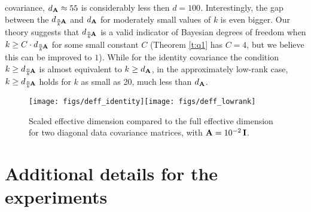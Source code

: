 \documentclass[11pt]{article}
\begin{document}
    covariance, $d_{\mathbf A}\approx 55$ is considerably less then
    $d=100$. Interestingly, the gap between the $d_{\frac nk\!\mathbf A}$ and 
    $d_{\mathbf A}$ for moderately small values of $k$ is even bigger. Our
    theory suggests that $d_{\frac nk\!\mathbf A}$ is a valid indicator of
    Bayesian degrees of freedom when $k\geq C\cdot d_{\frac nk\!\mathbf A}$
    for some small constant $C$ (Theorem \ref{t:q1} has $C=4$, but we
    believe this can be improved to $1$). While for the identity
    covariance the condition $k\geq
    d_{\frac nk\!\mathbf A}$ is almost equivalent to $k\geq d_{\mathbf A}$, in the
    approximately low-rank case, $k\geq d_{\frac nk\!\mathbf A}$ holds for
    $k$ as small as 20, much less than $d_{\mathbf A}$.
    \begin{figure}[htbp]
      \centering
      \texttt{[image: figs/deff\_identity]}\nobreak\texttt{[image: figs/deff\_lowrank]}
      \caption{Scaled effective dimension compared to the full effective
        dimension for two diagonal data covariance matrices, with
      $\mathbf A=10^{-2}\,\mathbf I$.}
      \label{f:deff}
    \end{figure}

\section{Additional details for the experiments}
\label{a:experiments}

\end{document}
